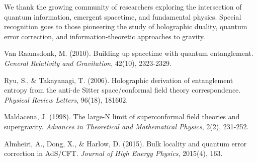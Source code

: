 \documentclass[12pt]{article}
\begin{document}
We thank the growing community of researchers exploring the intersection of quantum information, emergent spacetime, and fundamental physics. Special recognition goes to those pioneering the study of holographic duality, quantum error correction, and information-theoretic approaches to gravity.

\begin{thebibliography}{99}

 Van Raamsdonk, M. (2010). Building up spacetime with quantum entanglement. \emph{General Relativity and Gravitation}, 42(10), 2323-2329.

 Ryu, S., \& Takayanagi, T. (2006). Holographic derivation of entanglement entropy from the anti-de Sitter space/conformal field theory correspondence. \emph{Physical Review Letters}, 96(18), 181602.

 Maldacena, J. (1998). The large-N limit of superconformal field theories and supergravity. \emph{Advances in Theoretical and Mathematical Physics}, 2(2), 231-252.

 Almheiri, A., Dong, X., \& Harlow, D. (2015). Bulk locality and quantum error correction in AdS/CFT. \emph{Journal of High Energy Physics}, 2015(4), 163.

\end{thebibliography}
\end{document}
